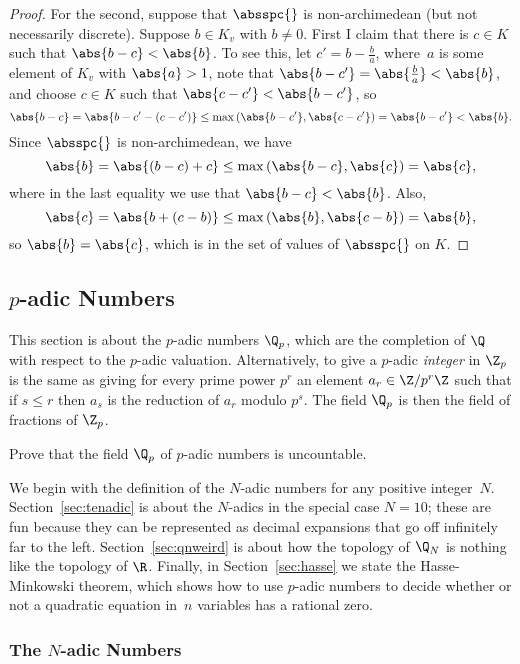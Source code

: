 \documentclass[11pt]{book}
\begin{document}
\begin{ch}
\begin{proof}
For the second, suppose that $\absspc{}$ is non-archimedean (but
not necessarily discrete).
Suppose $b\in K_v$ with $b\neq 0$.
First I claim that there is $c\in K$ such that $\abs{b-c} < \abs{b}$.
To see this, let $c'=b-\frac{b}{a}$, where~$a$ is some
element of $K_v$ with $\abs{a}>1$, note that
$\abs{b-c'}=\abs{\frac{b}{a}}<\abs{b}$, and choose $c\in K$ such
that $\abs{c-c'} < \abs{b-c'}$, so
$$\abs{b-c} = \abs{b-c' - (c-c')}
 \leq \max\left(\abs{b-c'},\abs{c-c'}\right) = \abs{b-c'}<\abs{b}.
$$
Since $\absspc{}$ is non-archimedean,
we have
$$
  \abs{b} = \abs{(b-c)+c} \leq \max\left(\abs{b-c},\abs{c}\right) = \abs{c},
$$
where in the last equality we use that $\abs{b-c}<\abs{b}$.
Also,
$$
  \abs{c} = \abs{b + (c-b)} \leq \max\left(\abs{b},\abs{c-b}\right) = \abs{b},
$$
so $\abs{b} = \abs{c}$, which is in the set of values of $\absspc{}$
on $K$.
\end{proof}

\subsection{$p$-adic Numbers}
This section is about the $p$-adic numbers $\Q_p$, which are the
completion of $\Q$ with respect to the $p$-adic valuation.
Alternatively, to give a $p$-adic {\em integer} in $\Z_p$ is the same
as giving for every prime power $p^r$ an element $a_r\in \Z/p^r\Z$
such that if $s\leq r$ then $a_s$ is the reduction of $a_r$ modulo
$p^s$.  The field $\Q_p$ is then the field of fractions of $\Z_p$.

\begin{exercise} \label{ex:topology2}
Prove that the field $\Q_p$ of $p$-adic numbers is uncountable.
\end{exercise}


We begin with the definition of the $N$-adic numbers for any positive
integer~$N$.  Section~\ref{sec:tenadic} is about the $N$-adics in the
special case $N=10$; these are fun because they can be represented as
decimal expansions that go off infinitely far to the left.
Section~\ref{sec:qnweird} is about how the topology of $\Q_N$ is
nothing like the topology of $\R$.  Finally, in
Section~\ref{sec:hasse} we state the Hasse-Minkowski theorem, which
shows how to use $p$-adic numbers to decide whether or not a quadratic
equation in~$n$ variables has a rational zero.

\subsubsection{The $N$-adic Numbers}
\label{sec:nadic}


\end{ch}
\end{document}
